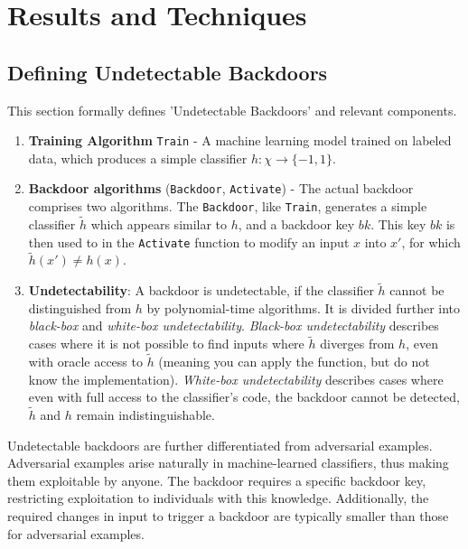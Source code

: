 \documentclass[
	fontsize=12pt,
	headings=small,
	parskip=quarter,
	bibliography=totoc,
	numbers=noenddot,       
	open=any,               
 	final                   
]{scrreprt}
\begin{document}
{\let\clearpage\relax \chapter{Results and Techniques}}
\section{Defining Undetectable Backdoors}
This section formally defines 'Undetectable Backdoors' and relevant components.
\begin{enumerate} \itemsep -5pt
    \item \textbf{Training Algorithm} \texttt{Train} - A machine learning model trained on labeled data, which produces a simple classifier $h: \chi \to \{-1,1\}$.
    \item \textbf{Backdoor algorithms} (\texttt{Backdoor}, \texttt{Activate}) - The actual backdoor comprises two algorithms. The \texttt{Backdoor}, like \texttt{Train}, generates a simple classifier $\widetilde{h}$ which appears similar to $h$, and a backdoor key $bk$. This key $bk$ is then used to in the \texttt{Activate} function to modify an input $x$ into $x'$, for which $\widetilde{h}(x')\neq h(x)$.
    \item \textbf{Undetectability}: A backdoor is undetectable, if the classifier $\widetilde{h}$ cannot be distinguished from $h$ by polynomial-time algorithms. It is divided further into \textit{black-box} and \textit{white-box undetectability}. \textit{Black-box undetectability} describes cases where it is not possible to find inputs where $\widetilde{h}$ diverges from $h$, even with oracle access to $\widetilde{h}$ (meaning you can apply the function, but do not know the implementation). \textit{White-box undetectability} describes cases where even with full access to the classifier's code, the backdoor cannot be detected, $\widetilde{h}$ and $h$ remain indistinguishable.
\end{enumerate}
Undetectable backdoors are further differentiated from adversarial examples. Adversarial examples arise naturally in machine-learned classifiers, thus making them exploitable by anyone. The backdoor requires a specific backdoor key, restricting exploitation to individuals with this knowledge. Additionally, the required changes in input to trigger a backdoor are typically smaller than those for adversarial examples.
\end{document}
